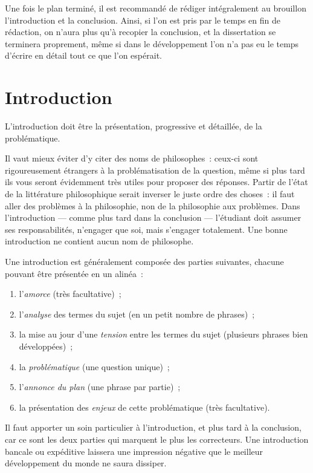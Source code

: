 \documentclass[a4paper,12pt]{article}
\begin{document}
Une fois le plan terminé, il est recommandé de rédiger intégralement au
brouillon l'introduction et la conclusion. Ainsi, si l'on est pris par
le temps en fin de rédaction, on n'aura plus qu'à recopier la
conclusion, et la dissertation se terminera proprement, même si dans le
développement l'on n'a pas eu le temps d'écrire en détail tout ce que
l'on espérait.

\section{Introduction}
\label{sec-2}

L'introduction doit être la présentation, progressive et détaillée, de
la problématique.

Il vaut mieux éviter d'y citer des noms de philosophes : ceux-ci sont
rigoureusement étrangers à la problématisation de la question, même si
plus tard ils vous seront évidemment très utiles pour proposer des
réponses. Partir de l'état de la littérature philosophique serait
inverser le juste ordre des choses : il faut aller des problèmes à la
philosophie, non de la philosophie aux problèmes. Dans l'introduction
--- comme plus tard dans la conclusion --- l'étudiant doit assumer ses
responsabilités, n'engager que soi, mais s'engager totalement. Une bonne
introduction ne contient aucun nom de philosophe.

Une introduction est généralement composée des parties suivantes,
chacune pouvant être présentée en un alinéa :

\begin{enumerate}
\item l'\emph{amorce} (très facultative) ;

\item l'\emph{analyse} des termes du sujet (en un petit nombre de phrases) ;

\item la mise au jour d'une \emph{tension} entre les termes du sujet (plusieurs
phrases bien développées) ;

\item la \emph{problématique} (une question unique) ;

\item l'\emph{annonce du plan} (une phrase par partie) ;

\item la présentation des \emph{enjeux} de cette problématique (très
facultative).
\end{enumerate}

Il faut apporter un soin particulier à l'introduction, et plus tard à la
conclusion, car ce sont les deux parties qui marquent le plus les
correcteurs. Une introduction bancale ou expéditive laissera une
impression négative que le meilleur développement du monde ne saura
dissiper.
\end{document}
